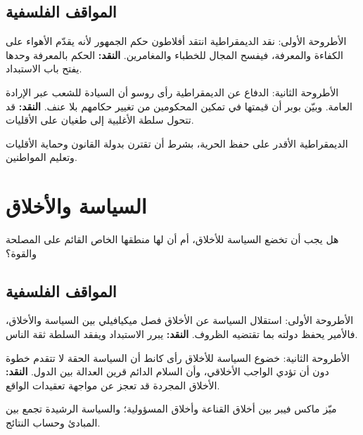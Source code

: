 \documentclass[12pt, twoside, openright]{book}
\newcommand{\setchap}[1]{\colorlet{chapcol}{#1}}
\begin{document}
\subsection*{المواقف الفلسفية}
\begin{positionbox}{الأطروحة الأولى: نقد الديمقراطية}
انتقد أفلاطون حكم الجمهور لأنه يقدّم الأهواء على الكفاءة والمعرفة، فيفسح المجال للخطباء والمغامرين. \textbf{النقد:} الحكم بالمعرفة وحدها يفتح باب الاستبداد.
\end{positionbox}
\begin{positionbox}{الأطروحة الثانية: الدفاع عن الديمقراطية}
رأى روسو أن السيادة للشعب عبر الإرادة العامة. وبيّن بوبر أن قيمتها في تمكين المحكومين من تغيير حكامهم بلا عنف. \textbf{النقد:} قد تتحول سلطة الأغلبية إلى طغيان على الأقليات.
\end{positionbox}
\begin{synthbox}
الديمقراطية الأقدر على حفظ الحرية، بشرط أن تقترن بدولة القانون وحماية الأقليات وتعليم المواطنين.
\end{synthbox}

\section{السياسة والأخلاق}
\begin{problembox}
هل يجب أن تخضع السياسة للأخلاق، أم أن لها منطقها الخاص القائم على المصلحة والقوة؟
\end{problembox}
\subsection*{المواقف الفلسفية}
\begin{positionbox}{الأطروحة الأولى: استقلال السياسة عن الأخلاق}
فصل ميكيافيلي بين السياسة والأخلاق، فالأمير يحفظ دولته بما تقتضيه الظروف. \textbf{النقد:} يبرر الاستبداد ويفقد السلطة ثقة الناس.
\end{positionbox}
\begin{positionbox}{الأطروحة الثانية: خضوع السياسة للأخلاق}
رأى كانط أن السياسة الحقة لا تتقدم خطوة دون أن تؤدي الواجب الأخلاقي، وأن السلام الدائم قرين العدالة بين الدول. \textbf{النقد:} الأخلاق المجردة قد تعجز عن مواجهة تعقيدات الواقع.
\end{positionbox}
\begin{synthbox}
ميّز ماكس فيبر بين أخلاق القناعة وأخلاق المسؤولية؛ والسياسة الرشيدة تجمع بين المبادئ وحساب النتائج.
\end{synthbox}

\setchap{colC}
\end{document}
